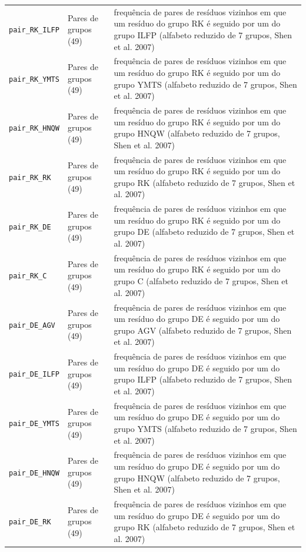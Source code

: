 \begin{longtable}{p{4.2cm}p{2.6cm}p{8cm}}
  \texttt{pair\_RK\_ILFP} & Pares de grupos (49) & frequência de pares de resíduos vizinhos em que um resíduo do grupo {RK} é seguido por um do grupo {ILFP} (alfabeto reduzido de 7 grupos, Shen et al. 2007) \\
  \texttt{pair\_RK\_YMTS} & Pares de grupos (49) & frequência de pares de resíduos vizinhos em que um resíduo do grupo {RK} é seguido por um do grupo {YMTS} (alfabeto reduzido de 7 grupos, Shen et al. 2007) \\
  \texttt{pair\_RK\_HNQW} & Pares de grupos (49) & frequência de pares de resíduos vizinhos em que um resíduo do grupo {RK} é seguido por um do grupo {HNQW} (alfabeto reduzido de 7 grupos, Shen et al. 2007) \\
  \texttt{pair\_RK\_RK} & Pares de grupos (49) & frequência de pares de resíduos vizinhos em que um resíduo do grupo {RK} é seguido por um do grupo {RK} (alfabeto reduzido de 7 grupos, Shen et al. 2007) \\
  \texttt{pair\_RK\_DE} & Pares de grupos (49) & frequência de pares de resíduos vizinhos em que um resíduo do grupo {RK} é seguido por um do grupo {DE} (alfabeto reduzido de 7 grupos, Shen et al. 2007) \\
  \texttt{pair\_RK\_C} & Pares de grupos (49) & frequência de pares de resíduos vizinhos em que um resíduo do grupo {RK} é seguido por um do grupo {C} (alfabeto reduzido de 7 grupos, Shen et al. 2007) \\
  \texttt{pair\_DE\_AGV} & Pares de grupos (49) & frequência de pares de resíduos vizinhos em que um resíduo do grupo {DE} é seguido por um do grupo {AGV} (alfabeto reduzido de 7 grupos, Shen et al. 2007) \\
  \texttt{pair\_DE\_ILFP} & Pares de grupos (49) & frequência de pares de resíduos vizinhos em que um resíduo do grupo {DE} é seguido por um do grupo {ILFP} (alfabeto reduzido de 7 grupos, Shen et al. 2007) \\
  \texttt{pair\_DE\_YMTS} & Pares de grupos (49) & frequência de pares de resíduos vizinhos em que um resíduo do grupo {DE} é seguido por um do grupo {YMTS} (alfabeto reduzido de 7 grupos, Shen et al. 2007) \\
  \texttt{pair\_DE\_HNQW} & Pares de grupos (49) & frequência de pares de resíduos vizinhos em que um resíduo do grupo {DE} é seguido por um do grupo {HNQW} (alfabeto reduzido de 7 grupos, Shen et al. 2007) \\
  \texttt{pair\_DE\_RK} & Pares de grupos (49) & frequência de pares de resíduos vizinhos em que um resíduo do grupo {DE} é seguido por um do grupo {RK} (alfabeto reduzido de 7 grupos, Shen et al. 2007) \\

\end{longtable}
